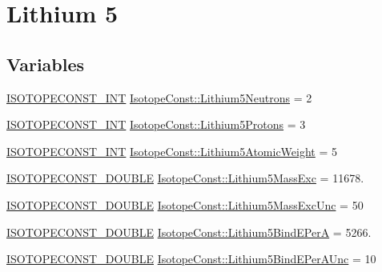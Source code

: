 \hypertarget{group___isotope_const-_lithium-_li5}{}\section{Lithium 5}
\label{group___isotope_const-_lithium-_li5}
\subsection*{Variables}
\begin{DoxyCompactItemize}
\item 
\mbox{\hyperlink{group___isotope_const-_macros_ga5f18360b3e99483a35c32d789e62621c}{I\+S\+O\+T\+O\+P\+E\+C\+O\+N\+S\+T\+\_\+\+I\+NT}} \mbox{\hyperlink{group___isotope_const-_lithium-_li5_ga35ffccf3108488535d0b89e600db3538}{Isotope\+Const\+::\+Lithium5\+Neutrons}} = 2
\item 
\mbox{\hyperlink{group___isotope_const-_macros_ga5f18360b3e99483a35c32d789e62621c}{I\+S\+O\+T\+O\+P\+E\+C\+O\+N\+S\+T\+\_\+\+I\+NT}} \mbox{\hyperlink{group___isotope_const-_lithium-_li5_ga91e3ea35651db8f9a9814d73e5894fd5}{Isotope\+Const\+::\+Lithium5\+Protons}} = 3
\item 
\mbox{\hyperlink{group___isotope_const-_macros_ga5f18360b3e99483a35c32d789e62621c}{I\+S\+O\+T\+O\+P\+E\+C\+O\+N\+S\+T\+\_\+\+I\+NT}} \mbox{\hyperlink{group___isotope_const-_lithium-_li5_ga4fcf3b184ee97f936398fef4dbd4e996}{Isotope\+Const\+::\+Lithium5\+Atomic\+Weight}} = 5
\item 
\mbox{\hyperlink{group___isotope_const-_macros_ga8f45a7272ce02c0b4c65c44636ed719a}{I\+S\+O\+T\+O\+P\+E\+C\+O\+N\+S\+T\+\_\+\+D\+O\+U\+B\+LE}} \mbox{\hyperlink{group___isotope_const-_lithium-_li5_ga943a502e514dded7af0b9bc24c1c82c1}{Isotope\+Const\+::\+Lithium5\+Mass\+Exc}} = 11678.
\item 
\mbox{\hyperlink{group___isotope_const-_macros_ga8f45a7272ce02c0b4c65c44636ed719a}{I\+S\+O\+T\+O\+P\+E\+C\+O\+N\+S\+T\+\_\+\+D\+O\+U\+B\+LE}} \mbox{\hyperlink{group___isotope_const-_lithium-_li5_ga92845a7b1d2bfe89b461e90bd1779b16}{Isotope\+Const\+::\+Lithium5\+Mass\+Exc\+Unc}} = 50
\item 
\mbox{\hyperlink{group___isotope_const-_macros_ga8f45a7272ce02c0b4c65c44636ed719a}{I\+S\+O\+T\+O\+P\+E\+C\+O\+N\+S\+T\+\_\+\+D\+O\+U\+B\+LE}} \mbox{\hyperlink{group___isotope_const-_lithium-_li5_ga168a5ad091e8c5f12a3eed108eec2498}{Isotope\+Const\+::\+Lithium5\+Bind\+E\+PerA}} = 5266.
\item 
\mbox{\hyperlink{group___isotope_const-_macros_ga8f45a7272ce02c0b4c65c44636ed719a}{I\+S\+O\+T\+O\+P\+E\+C\+O\+N\+S\+T\+\_\+\+D\+O\+U\+B\+LE}} \mbox{\hyperlink{group___isotope_const-_lithium-_li5_ga41bf95671962b626d9bdb82a1fea9a34}{Isotope\+Const\+::\+Lithium5\+Bind\+E\+Per\+A\+Unc}} = 10

\end{DoxyCompactItemize}
